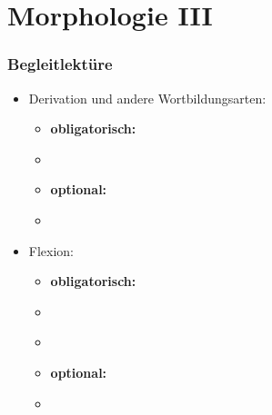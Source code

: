 
\nocite{Eisenberg00a}
\nocite{Fleischer00a} %
\nocite{Fleischer&Barz12a} %
\nocite{Fries&MyP16j} %
\nocite{Grewendorf&Co91a} %
\nocite{Haspelmath2002a}
\nocite{MyP18b} %
\nocite{Olsen86a} %


\section{Morphologie III}

\begin{frame}
\frametitle{Begleitlektüre}

\begin{itemize}
	\item Derivation und andere Wortbildungsarten:

	\begin{itemize}
		\item \textbf{obligatorisch:}
		\item[] \citet[46--51]{Abramowski2016a}
		\item \textbf{optional:}
		\item[] \citet[Kap. 2, S. 48--66]{Meibauer&Co07a}
		
	\end{itemize}

	\item Flexion:

	\begin{itemize}
		\item \textbf{obligatorisch:}
		\item[] \citet[51--53]{Abramowski2016a}
		\item[] \citet[Kap. 8]{Luedeling2009a}		
		
		\item \textbf{optional:}
		\item[] \citet[Kap. 2, S. 21--29]{Meibauer&Co07a}
	\end{itemize}	
\end{itemize}

\end{frame}


